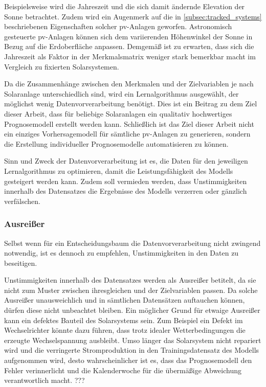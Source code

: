 \documentclass[12pt, a4paper]{article}
\newcommand*{\fullref}[1]{\hyperref[{#1}]{\autoref*{#1} \textit{\nameref*{#1}}}}
\begin{document}
Beispielsweise wird die Jahreszeit und die sich damit ändernde Elevation der Sonne betrachtet. Zudem wird ein Augenmerk auf die in \fullref{subsec:tracked_systems} beschriebenen Eigenschaften solcher \ac{pv}-Anlagen geworfen. Astronomisch gesteuerte \ac{pv}-Anlagen können sich dem variierenden Höhenwinkel der Sonne in Bezug auf die Erdoberfläche anpassen. Demgemäß ist zu erwarten, dass sich die Jahreszeit als Faktor in der Merkmalsmatrix weniger stark bemerkbar macht im Vergleich zu fixierten Solarsystemen. 

Da die Zusammenhänge zwischen den Merkmalen und der Zielvariablen je nach Solaranlage unterschiedlich sind, wird ein Lernalgorithmus ausgewählt, der möglichst wenig Datenvorverarbeitung benötigt. Dies ist ein Beitrag zu dem Ziel dieser Arbeit, dass für beliebige Solaranlagen ein qualitativ hochwertiges Prognosemodell erstellt werden kann. Schließlich ist das Ziel dieser Arbeit nicht ein einziges Vorhersagemodell für sämtliche \ac{pv}-Anlagen zu generieren, sondern die Erstellung individueller Prognosemodelle automatisieren zu können.

Sinn und Zweck der Datenvorverarbeitung ist es, die Daten für den jeweiligen Lernalgorithmus zu optimieren, damit die Leistungsfähigkeit des Modells gesteigert werden kann. Zudem soll vermieden werden, dass Unstimmigkeiten innerhalb des Datensatzes die Ergebnisse des Modells verzerren oder gänzlich verfälschen.

\subsubsection{Ausreißer}
\label{subsubsec:outlier}

Selbst wenn für ein Entscheidungsbaum die Datenvorverarbeitung nicht zwingend notwendig, ist es dennoch zu empfehlen, Unstimmigkeiten in den Daten zu beseitigen.

Unstimmigkeiten innerhalb des Datensatzes werden als Ausreißer betitelt, da sie nicht zum Muster zwischen ihresgleichen und der Zielvariablen passen. Da solche Ausreißer unausweichlich und in sämtlichen Datensätzen auftauchen können, dürfen diese nicht unbeachtet bleiben. Ein möglicher Grund für etwaige Ausreißer kann ein defektes Bauteil des Solarsystems sein. Zum Beispiel ein Defekt im Wechselrichter könnte dazu führen, dass trotz idealer Wetterbedingungen die erzeugte Wechselspannung ausbleibt. Umso länger das Solarsystem nicht repariert wird und die verringerte Stromproduktion in den Trainingsdatensatz des Modells aufgenommen wird, desto wahrscheinlicher ist es, dass das Prognosemodell den Fehler verinnerlicht und die Kalenderwoche für die übermäßige Abweichung verantwortlich macht.
???
\end{document}
